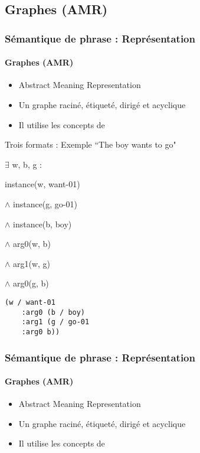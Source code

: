 \documentclass[xcolor=table]{beamer}
\begin{document}
\subsection{Graphes (AMR)}

\begin{frame}[fragile]
	\frametitle{Sémantique de phrase : Représentation}
	\framesubtitle{Graphes (AMR)}
	
	\begin{itemize}
		\item Abstract Meaning Representation \cite{2013-banarescu-al}
		\item Un graphe raciné, étiqueté, dirigé et acyclique
		\item Il utilise les concepts de 
	\end{itemize}

	\begin{exampleblock}{Trois formats : Exemple ``The boy wants to go"}
		\begin{minipage}{.3\textwidth}
			
			\footnotesize
			$ \exists $ w, b, g : 
			
			instance(w, want-01) 
			
			$ \wedge $ instance(g, go-01) 
			
			$ \wedge $ instance(b, boy) 
			
			$ \wedge $ arg0(w, b) 
			
			$ \wedge $ arg1(w, g) 
			
			$ \wedge $ arg0(g, b)
		\end{minipage}
		\begin{minipage}{.35\textwidth}
			
			\begin{verbatim}
(w / want-01
    :arg0 (b / boy)
    :arg1 (g / go-01
    :arg0 b))
			\end{verbatim}
			
		\end{minipage}
		\begin{minipage}{.3\textwidth}
			
		\end{minipage}
	\end{exampleblock}
	
\end{frame}

\begin{frame}[fragile]
	\frametitle{Sémantique de phrase : Représentation}
	\framesubtitle{Graphes (AMR)}
	
	\begin{itemize}
		\item Abstract Meaning Representation \cite{2013-banarescu-al}
		\item Un graphe raciné, étiqueté, dirigé et acyclique
		\item Il utilise les concepts de 
	\end{itemize}
	
\end{frame}

\end{document}

